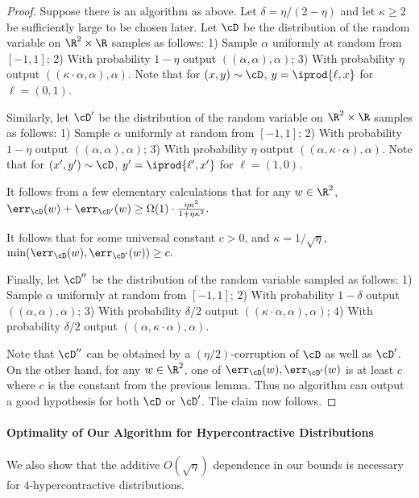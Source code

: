 \begin{proof}
Suppose there is an algorithm as above. Let $\delta = \eta/(2-\eta)$ and let $\kappa \geq 2$ be sufficiently large to be chosen later. 
Let $\cD$ be the distribution of the random variable on $\R^2 \times \R$ samples as follows: 1) Sample $\alpha$ uniformly at random from $[-1,1]$; 2) With probability $1-\eta$ output $((\alpha, \alpha), \alpha)$; 3) With probability $\eta$ output $((\kappa\cdot \alpha,\alpha),\alpha)$. Note that for $(x,y) \sim \cD$, $y = \iprod{\ell,x}$ for $\ell = (0,1)$. 

Similarly, let $\cD'$ be the distribution of the random variable on $\R^2 \times \R$ samples as follows: 1) Sample $\alpha$ uniformly at random from $[-1,1]$; 2) With probability $1-\eta$ output $((\alpha, \alpha), \alpha)$; 3) With probability $\eta$ output $((\alpha,\kappa \cdot \alpha),\alpha)$. Note that for $(x',y') \sim \cD$, $y' = \iprod{\ell',x'}$ for $\ell = (1,0)$. 

It follows from a few elementary calculations that for any $w \in \R^2$, 
$\err_{\cD}(w) + \err_{\cD'}(w) \geq \Omega(1) \cdot \frac{ \eta \kappa^2}{1 + \eta \kappa^2}.$

It follows that for some universal constant $c > 0$, and $\kappa = 1/\sqrt{\eta}$, $\min(\err_\cD(w), \err_{\cD'}(w)) \geq c .$


Finally, let $\cD''$ be the distribution of the random variable sampled as follows: 
1) Sample $\alpha$ uniformly at random from $[-1,1]$; 2) With probability $1-\delta$ output $((\alpha, \alpha), \alpha)$; 3) With probability $\delta/2$ output $((\kappa\cdot \alpha,\alpha),\alpha)$; 4) With probability $\delta/2$ output $((\alpha, \kappa \cdot \alpha),\alpha)$. 

Note that $\cD''$ can be obtained by a $(\eta/2)$-corruption of $\cD$ as well as $\cD'$. On the other hand, for any $w \in \R^2$, one of $\err_\cD(w), \err_{\cD'}(w)$ is at least $c$ where $c$ is the constant from the previous lemma. Thus no algorithm can output a good hypothesis for both $\cD$ or $\cD'$. The claim now follows. 
\end{proof}

\paragraph{Optimality of Our Algorithm for Hypercontractive Distributions}
We also show that the additive $O(\sqrt{\eta})$ dependence in our bounds is necessary for $4$-hypercontractive distributions. 

